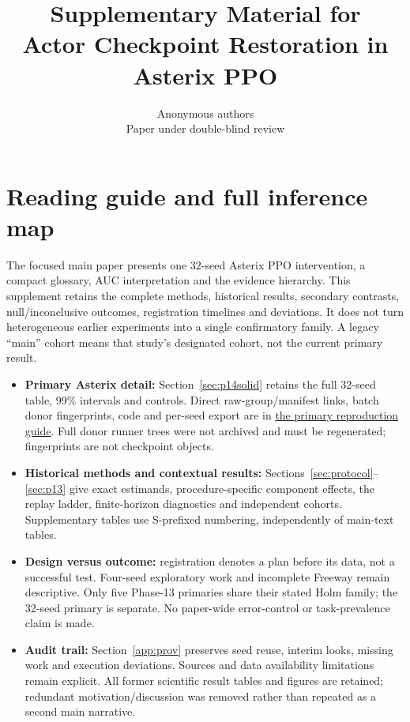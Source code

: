 \documentclass[10pt]{article} %
\title{Supplementary Material for\\Actor Checkpoint Restoration in Asterix PPO}
\author{\name Anonymous authors \\ \addr Paper under double-blind review}
\begin{document}
\maketitle
\renewcommand{\thesection}{S\arabic{section}}
\renewcommand{\thetable}{S\arabic{table}}
\renewcommand{\thefigure}{S\arabic{figure}}
\renewcommand{\theequation}{S\arabic{equation}}
\section{Reading guide and full inference map}\label{sup:roadmap}
The focused main paper presents one 32-seed Asterix PPO intervention, a compact glossary, AUC interpretation and the evidence hierarchy. This supplement retains the complete methods, historical results, secondary contrasts, null/inconclusive outcomes, registration timelines and deviations. It does not turn heterogeneous earlier experiments into a single confirmatory family. A legacy ``main'' cohort means that study's designated cohort, not the current primary result.

\begin{itemize}[leftmargin=*]
\item \textbf{Primary Asterix detail:} Section~\ref{sec:p14solid} retains the full 32-seed table, 99\% intervals and controls. Direct raw-group/manifest links, batch donor fingerprints, code and per-seed export are in \href{https://github.com/Nityahapani/rlearlydamage/blob/main/docs/primary_asterix_reproduction.md}{the primary reproduction guide}. Full donor runner trees were not archived and must be regenerated; fingerprints are not checkpoint objects.
\item \textbf{Historical methods and contextual results:} Sections~\ref{sec:protocol}--\ref{sec:p13} give exact estimands, procedure-specific component effects, the replay ladder, finite-horizon diagnostics and independent cohorts. Supplementary tables use S-prefixed numbering, independently of main-text tables.
\item \textbf{Design versus outcome:} registration denotes a plan before its data, not a successful test. Four-seed exploratory work and incomplete Freeway remain descriptive. Only five Phase-13 primaries share their stated Holm family; the 32-seed primary is separate. No paper-wide error-control or task-prevalence claim is made.
\item \textbf{Audit trail:} Section~\ref{app:prov} preserves seed reuse, interim looks, missing work and execution deviations. Sources and data availability limitations remain explicit. All former scientific result tables and figures are retained; redundant motivation/discussion was removed rather than repeated as a second main narrative.
\end{itemize}
\end{document}
